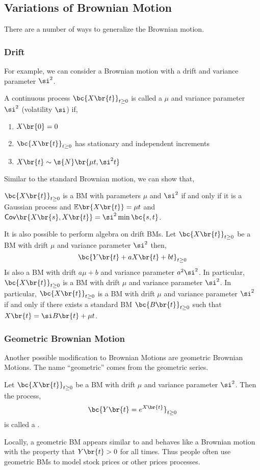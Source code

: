 \documentclass{article}
\newcommand{\Cov}{\textsf{Cov}}
\newcommand{\Exp}{\mathbb{E}}
\begin{document}
    \subsection{Variations of Brownian Motion}
    There are a number of ways to generalize the Brownian motion. \\

    \subsubsection{Drift}
    For example, we can consider a Brownian motion with a drift and variance parameter $\si^2$.
    \begin{definition}
        A continuous process $\bc{X\br{t}}_{t \geq 0}$ is called a  $\mu$ and variance parameter $\si^2$ (volatility $\si$) if,
        \begin{enumerate}
            \item $X\br{0} = 0$
            \item $\bc{X\br{t}}_{t \geq 0}$ has stationary and independent increments
            \item $X\br{t} \sim \s{N}\br{\mu t, \si^2 t}$
        \end{enumerate}
    \end{definition}
    Similar to the standard Brownian motion, we can show that,
    \begin{theorem}
        $\bc{X\br{t}}_{t \geq 0}$ is a BM with parameters $\mu$ and $\si^2$ if and only if it is a Gaussian process and $\Exp\br{X\br{t}} = \mu t$ and $\Cov\br{X\br{s}, X\br{t}} = \si^2 \min\bc{s, t}$.
    \end{theorem}
    It is also possible to perform algebra on drift BMs. Let $\bc{X\br{t}}_{t \geq 0}$ be a BM with drift $\mu$ and variance parameter $\si^2$ then,
    \[ \bc{Y\br{t} + aX\br{t} + bt}_{t \geq 0} \]
    Is also a BM with drift $a \mu + b$ and variance parameter $a^2 \si^2$. In particular, $\bc{X\br{t}}_{t \geq 0}$ is a BM with drift $\mu$ and variance parameter $\si^2$. In particular, $\bc{X\br{t}}_{t \geq 0}$ is a BM with drift $\mu$ and variance parameter $\si^2$ if and only if there exists a standard BM $\bc{B\br{t}}_{t \geq 0}$ such that $X\br{t} = \si B\br{t} + \mu t$.

    \subsubsection{Geometric Brownian Motion}
    Another possible modification to Brownian Motions are geometric Brownian Motions. The name ``geometric'' comes from the geometric series.
    \begin{definition}
        Let $\bc{X\br{t}}_{t \geq 0}$ be a BM with drift $\mu$ and variance parameter $\si^2$. Then the process,
        \[ \bc{Y\br{t} = e^{X\br{t}}}_{t \geq 0} \]
        is called a .
    \end{definition}
    Locally, a geometric BM appears similar to and behaves like a Brownian motion with the property that $Y\br{t} > 0$ for all times. Thus people often use geometric BMs to model stock prices or other prices processes.
\end{document}
